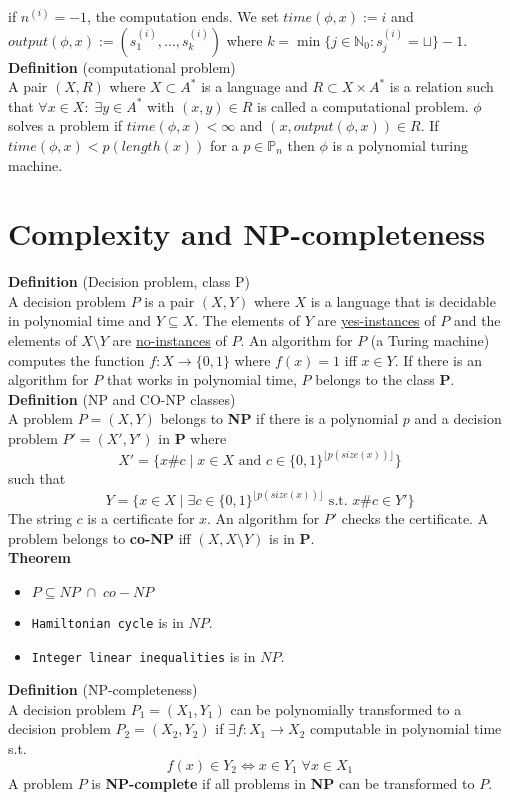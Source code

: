 \documentclass[a4paper, 12pt]{article}
\begin{document}
	if $n^{(i)} = -1$, the computation ends. We set $time(\phi, x) := i$ and $output(\phi, x) := (s_1^{(i)}, ..., s_k^{(i)})$ where $k = \min\{j \in \mathbb{N}_0 : s_j^{(i)} = \sqcup\} -1$.\\
	\textbf{Definition} (computational problem)\\
	A pair $(X, R)$ where $X\subset A^*$ is a language and $R\subset X \times A^*$ is a relation such that $\forall x \in X: \; \exists y \in A^*$ with $(x,y) \in R$ is called a computational problem. $\phi$ solves a problem if $time(\phi, x) < \infty$ and $(x, output(\phi, x)) \in R$. If $time(\phi, x) < p(length(x))$ for a $p \in \mathbb{P}_n$ then $\phi$ is a polynomial turing machine.
	
	\section{Complexity and NP-completeness}
	\textbf{Definition} (Decision problem, class P)\\
	A decision problem $P$ is a pair $(X,Y)$ where $X$ is a language that is decidable in polynomial time and $Y\subseteq X$. The elements of $Y$ are \underline{yes-instances} of $P$ and the elements of $X\setminus Y$ are \underline{no-instances} of $P$. An algorithm for $P$ (a Turing machine) computes the function $f: X\to \{0,1\}$ where $f(x) = 1$ iff $x \in Y$. If there is an algorithm for $P$ that works in polynomial time, $P$ belongs to the class \textbf{P}.\\
	\textbf{Definition} (NP and CO-NP classes)\\
	A problem $P = (X,Y)$ belongs to \textbf{NP} if there is a polynomial $p$ and a decision problem $P' = (X',Y')$ in \textbf{P} where \[X' = \{x\# c \;|\; x \in X \text{ and } c \in \{0,1\}^{\lfloor p(size(x))\rfloor}\}\]
	such that \[Y = \{x \in X \; |\; \exists c \in \{0,1\}^{\lfloor p(size(x))\rfloor} \text{ s.t. } x\#c \in Y'\}\]
	The string $c$ is a certificate for $x$. An algorithm for $P'$ checks the certificate. A problem belongs to \textbf{co-NP} iff $(X, X\setminus Y)$ is in \textbf{P}.\\
	\textbf{Theorem}
	\begin{itemize}
		\item $P \subseteq NP \;\cap\; co-NP$
		\item \texttt{Hamiltonian cycle} is in $NP$.
		\item \texttt{Integer linear inequalities} is in $NP$.
	\end{itemize}
	\textbf{Definition} (NP-completeness)\\
	A decision problem $P_1 = (X_1, Y_1)$ can be polynomially transformed to a decision problem $P_2 = (X_2,Y_2)$ if $\exists f: X_1 \to X_2$ computable in polynomial time s.t. \[f(x) \in Y_2 \Leftrightarrow x \in Y_1 \; \forall x \in X_1\]
	A problem $P$ is \textbf{NP-complete} if all problems in \textbf{NP} can be transformed to $P$.
\end{document}
